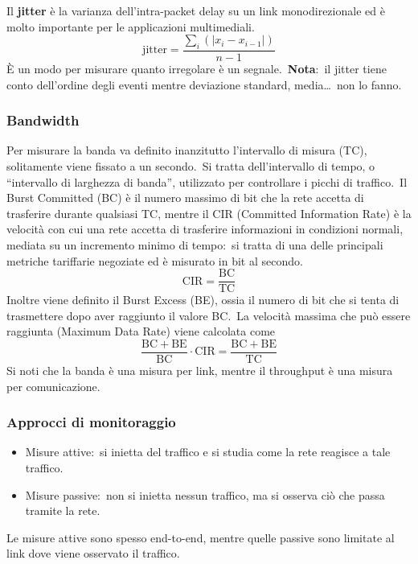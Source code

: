 Il \textbf{jitter} è la varianza dell'intra-packet delay su un link monodirezionale ed è molto importante per le applicazioni multimediali.\
\[\mathrm{jitter} = \frac{\sum_i (|x_i - x_{i-1}|)}{n-1}\]
È un modo per misurare quanto irregolare è un segnale.\
\textbf{Nota}:\ il jitter tiene conto dell'ordine degli eventi mentre deviazione standard, media\dots\ non lo fanno.

\subsubsection{Bandwidth}

Per misurare la banda va definito inanzitutto l'intervallo di misura (TC), solitamente viene fissato a un secondo.\
Si tratta dell'intervallo di tempo, o ``intervallo di larghezza di banda'', utilizzato per controllare i picchi di traffico.\
Il Burst Committed (BC) è il numero massimo di bit che la rete accetta di trasferire durante qualsiasi TC, mentre il CIR (Committed Information Rate) è la velocità con cui una rete accetta di trasferire informazioni in condizioni normali, mediata su un incremento minimo di tempo:\ si tratta di una delle principali metriche tariffarie negoziate ed è misurato in bit al secondo.\
\[\mathrm{CIR} = \frac{\mathrm{BC}}{\mathrm{TC}}\]
Inoltre viene definito il Burst Excess (BE), ossia il numero di bit che si tenta di trasmettere dopo aver raggiunto il valore BC.\
La velocità massima che può essere raggiunta (Maximum Data Rate) viene calcolata come
\[\frac{\mathrm{BC + BE}}{\mathrm{BC}}\cdot\mathrm{CIR}=\frac{\mathrm{BC + BE}}{\mathrm{TC}}\]
Si noti che la banda è una misura per link, mentre il throughput è una misura per comunicazione.\

\subsubsection{Approcci di monitoraggio}

\begin{itemize}
    \item Misure attive:\ si inietta del traffico e si studia come la rete reagisce a tale traffico.
    \item Misure passive:\ non si inietta nessun traffico, ma si osserva ciò che passa tramite la rete.
\end{itemize}

\noindent Le misure attive sono spesso end-to-end, mentre quelle passive sono limitate al link dove viene osservato il traffico.\

